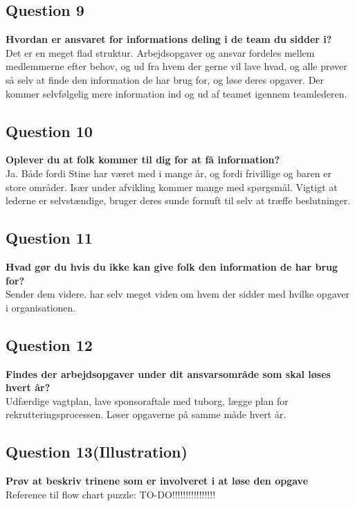 \subsection{Question 9}
\label{i4q9}
\noindent \textbf{Hvordan er ansvaret for informations deling i de team du sidder i?} \\
Det er en meget flad struktur. Arbejdsopgaver og ansvar fordeles mellem medlemmerne efter behov, og ud fra hvem der gerne vil lave hvad, og alle prøver så selv at finde den information de har brug for, og løse deres opgaver. Der kommer selvfølgelig mere information ind og ud af teamet igennem  teamlederen.

\subsection{Question 10}
\label{i4q10}
\noindent \textbf{Oplever du at folk kommer til dig for at få information?} \\
Ja. Både fordi Stine har været med i mange år, og fordi frivillige og baren er store områder. Især under afvikling kommer mange med spørgsmål. Vigtigt at lederne er selvstændige, bruger deres sunde fornuft til selv at træffe beslutninger. 

\subsection{Question 11}
\label{i4q11}
\noindent \textbf{Hvad gør du hvis du ikke kan give folk den information de har brug for?} \\
Sender dem videre. har selv meget viden om hvem der sidder med hvilke opgaver i organisationen.

\subsection{Question 12}
\label{i4q12}
\noindent \textbf{Findes der arbejdsopgaver under dit ansvarsområde som skal løses hvert år?} \\
Udfærdige vagtplan, lave sponsoraftale med tuborg, lægge plan for rekrutteringsprocessen. Løser opgaverne på samme måde hvert år.

\subsection{Question 13(Illustration)}
\label{i4q13}
\noindent \textbf{Prøv at beskriv trinene som er involveret i at løse den opgave} \\
Reference til flow chart puzzle: TO-DO!!!!!!!!!!!!!!!!